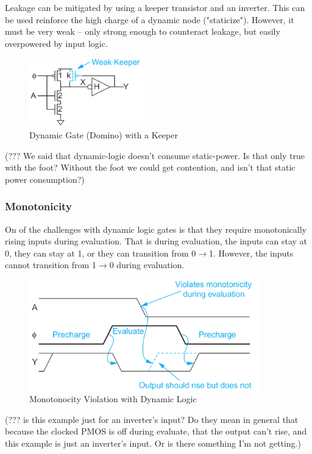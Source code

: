 \documentclass{article}
\begin{document}
Leakage can be mitigated by using a keeper transistor and an inverter. This can be used reinforce the high charge of a dynamic node ("staticize"). However, it must be very weak -- only strong enough to counteract leakage, but easily overpowered by input logic. 

\begin{figure}[ht!]
\centering
\includegraphics[width=50mm]{keeper.png}
\caption{Dynamic Gate (Domino) with a Keeper}
\end{figure}

(??? We said that dynamic-logic doesn't consume static-power. Is that only true with the foot? Without the foot we could get contention, and isn't that static power consumption?)

\subsubsection{Monotonicity}

On of the challenges with dynamic logic gates is that they require monotonically rising inputs during evaluation. That is during evaluation, the inputs can stay at 0, they can stay at 1, or they can transition from 0$\rightarrow$1. However, the inputs cannot transition from 1$\rightarrow$0 during evaluation.


\begin{figure}[ht!]
\centering
\includegraphics[width=100mm]{Mono.png}
\caption{Monotonocity Violation with Dynamic Logic}
\end{figure}



(??? is this example just for an inverter's input? Do they mean in general that because the clocked PMOS is off during evaluate, that the output can't rise, and this example is just an inverter's input. Or is there something I'm not getting.)
\end{document}
